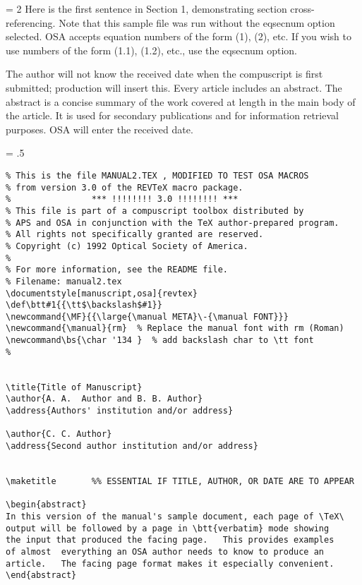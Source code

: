 \baselineskip = 2\baselineskip
Here is the first sentence in Section  1, demonstrating
section cross-referencing. Note that this sample file was run
without the eqsecnum option selected.  OSA accepts equation numbers
of the form (1), (2), etc.  If you wish to use numbers of the form
(1.1), (1.2), etc., use the eqsecnum option.

The author will not know the received date when the compuscript
is first submitted; production will insert this. Every
article includes an abstract.  The abstract is a concise
summary of the work covered at length
in the main body of the article.
It is used for secondary publications and for information retrieval
purposes.  OSA will enter the received date.

\newpage
\baselineskip = .5\baselineskip  %
\begin{verbatim}
% This is the file MANUAL2.TEX , MODIFIED TO TEST OSA MACROS
% from version 3.0 of the REVTeX macro package.
%                *** !!!!!!!! 3.0 !!!!!!!! ***
% This file is part of a compuscript toolbox distributed by
% APS and OSA in conjunction with the TeX author-prepared program.
% All rights not specifically granted are reserved.
% Copyright (c) 1992 Optical Society of America.
%
% For more information, see the README file.
% Filename: manual2.tex
\documentstyle[manuscript,osa]{revtex}
\def\btt#1{{\tt$\backslash$#1}}
\newcommand{\MF}{{\large{\manual META}\-{\manual FONT}}}
\newcommand{\manual}{rm}  % Replace the manual font with rm (Roman)
\newcommand\bs{\char '134 }  % add backslash char to \tt font
%


\title{Title of Manuscript}
\author{A. A.  Author and B. B. Author}
\address{Authors' institution and/or address}

\author{C. C. Author}
\address{Second author institution and/or address}


\maketitle       %% ESSENTIAL IF TITLE, AUTHOR, OR DATE ARE TO APPEAR

\begin{abstract}
In this version of the manual's sample document, each page of \TeX\
output will be followed by a page in \btt{verbatim} mode showing
the input that produced the facing page.   This provides examples
of almost  everything an OSA author needs to know to produce an
article.   The facing page format makes it especially convenient.
\end{abstract}


\end{verbatim}
